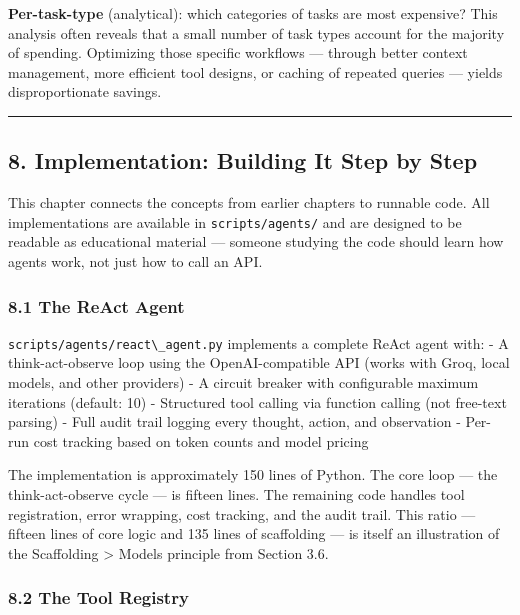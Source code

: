 \documentclass[11pt, a4paper]{article}
\newcommand{\passthrough}[1]{#1}
\begin{document}
\textbf{Per-task-type} (analytical): which categories of tasks are most
expensive? This analysis often reveals that a small number of task types
account for the majority of spending. Optimizing those specific
workflows --- through better context management, more efficient tool
designs, or caching of repeated queries --- yields disproportionate
savings.

\begin{center}\rule{0.5\linewidth}{0.5pt}\end{center}

\hypertarget{implementation-building-it-step-by-step}{%
\subsection{8. Implementation: Building It Step by
Step}\label{implementation-building-it-step-by-step}}

This chapter connects the concepts from earlier chapters to runnable
code. All implementations are available in
\passthrough{\lstinline!scripts/agents/!} and are designed to be
readable as educational material --- someone studying the code should
learn how agents work, not just how to call an API.

\hypertarget{the-react-agent}{%
\subsubsection{8.1 The ReAct Agent}\label{the-react-agent}}

\passthrough{\lstinline!scripts/agents/react\_agent.py!} implements a
complete ReAct agent with: - A think-act-observe loop using the
OpenAI-compatible API (works with Groq, local models, and other
providers) - A circuit breaker with configurable maximum iterations
(default: 10) - Structured tool calling via function calling (not
free-text parsing) - Full audit trail logging every thought, action, and
observation - Per-run cost tracking based on token counts and model
pricing

The implementation is approximately 150 lines of Python. The core loop
--- the think-act-observe cycle --- is fifteen lines. The remaining code
handles tool registration, error wrapping, cost tracking, and the audit
trail. This ratio --- fifteen lines of core logic and 135 lines of
scaffolding --- is itself an illustration of the Scaffolding
\textgreater{} Models principle from Section 3.6.

\hypertarget{the-tool-registry}{%
\subsubsection{8.2 The Tool Registry}\label{the-tool-registry}}
\end{document}
